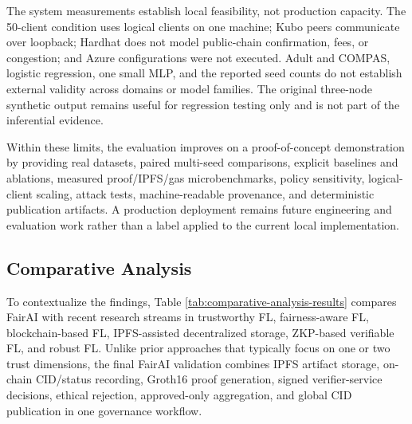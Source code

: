 \documentclass[futureinternet,article,submit,pdftex,moreauthors]{Definitions/mdpi}
\begin{document}
The system measurements establish local feasibility, not production capacity. The 50-client condition uses logical clients on one machine; Kubo peers communicate over loopback; Hardhat does not model public-chain confirmation, fees, or congestion; and Azure configurations were not executed. Adult and COMPAS, logistic regression, one small MLP, and the reported seed counts do not establish external validity across domains or model families. The original three-node synthetic output remains useful for regression testing only and is not part of the inferential evidence.

Within these limits, the evaluation improves on a proof-of-concept demonstration by providing real datasets, paired multi-seed comparisons, explicit baselines and ablations, measured proof/IPFS/gas microbenchmarks, policy sensitivity, logical-client scaling, attack tests, machine-readable provenance, and deterministic publication artifacts. A production deployment remains future engineering and evaluation work rather than a label applied to the current local implementation.

\subsection{Comparative Analysis}
\label{subsec:discussion-comparative-analysis}

To contextualize the findings, Table \ref{tab:comparative-analysis-results} compares FairAI with recent research streams in trustworthy FL, fairness-aware FL, blockchain-based FL, IPFS-assisted decentralized storage, ZKP-based verifiable FL, and robust FL. Unlike prior approaches that typically focus on one or two trust dimensions, the final FairAI validation combines IPFS artifact storage, on-chain CID/status recording, Groth16 proof generation, signed verifier-service decisions, ethical rejection, approved-only aggregation, and global CID publication in one governance workflow.
\end{document}
